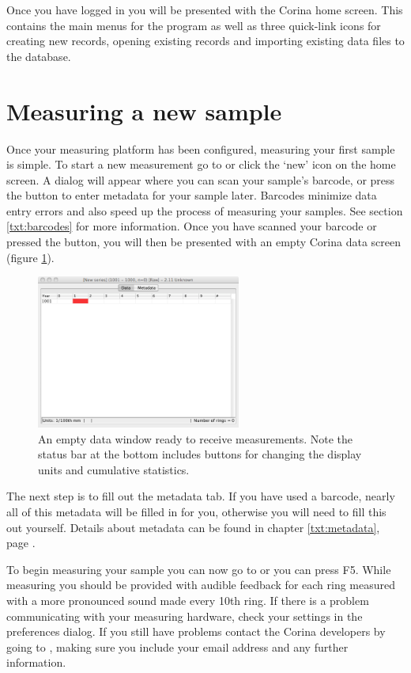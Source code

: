 Once you have logged in you will be presented with the Corina home screen.  This contains the main menus for the program as well as three quick-link icons for creating new records, opening existing records and importing existing data files to the database.

\section{Measuring a new sample}
Once your measuring platform has been configured, measuring your first sample is simple.  To start a new measurement go to  or click the `new' icon on the home screen. A dialog will appear where you can scan your sample's barcode, or press the button to enter metadata for your sample later. Barcodes minimize data entry errors and also speed up the process of measuring your samples. See section \ref{txt:barcodes} for more information. Once you have scanned your barcode or pressed the button, you will then be presented with an empty Corina data screen (figure \ref{fig:datascreen}).

\begin{figure}[hbtp]
  \centering
    \includegraphics[width=0.6\textwidth]{Images/datascreen.png}
    \caption{An empty data window ready to receive measurements.  Note the status bar at the bottom includes buttons for changing the display units and cumulative statistics.}
    \label{fig:datascreen}
\end{figure}

The next step is to fill out the metadata tab. If you have used a barcode, nearly all of this metadata will be filled in for you, otherwise you will need to fill this out yourself. Details about metadata can be found in chapter \ref{txt:metadata}, page \pageref{txt:metadata}.

To begin measuring your sample you can now go to  or you can press F5. While measuring you should be provided with audible feedback for each ring measured with a more pronounced sound made every 10th ring. If there is a problem communicating with your measuring hardware, check your settings in the preferences dialog. If you still have problems contact the Corina developers by going to , making sure you include your email address and any further information.


